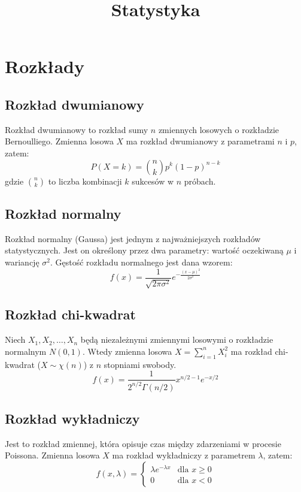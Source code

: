 \documentclass{../notatki}
\title{Statystyka}
\begin{document}
\tableofcontents

\section{Rozkłady}

\subsection{Rozkład dwumianowy}

Rozkład dwumianowy to rozkład sumy $n$ zmiennych losowych o rozkładzie
Bernoulliego. Zmienna losowa $X$ ma rozkład dwumianowy z parametrami $n$ i $p$,
zatem:
$$
P(X = k) = \binom{n}{k} p^k (1 - p)^{n-k}
$$
gdzie $\binom{n}{k}$ to liczba kombinacji $k$ sukcesów w $n$ próbach.

\subsection{Rozkład normalny}

Rozkład normalny (Gaussa) jest jednym z najważniejszych rozkładów
statystycznych. Jest on określony przez dwa parametry: wartość oczekiwaną
$\mu$ i wariancję $\sigma^2$. Gęstość rozkładu normalnego jest dana wzorem:
$$
f(x) = \frac{1}{\sqrt{2\pi\sigma^2}} e^{-\frac{(x - \mu)^2}{2\sigma^2}}
$$

\subsection{Rozkład chi-kwadrat}

Niech $X_1, X_2, \ldots, X_n$ będą niezależnymi zmiennymi losowymi o rozkładzie
normalnym $N(0, 1)$. Wtedy zmienna losowa $X = \sum_{i = 1}^{n} X_i^2$ ma
rozkład chi-kwadrat ($X \sim \chi(n)$) z $n$ stopniami swobody.
$$
f(x) =  \frac{1}{2^{n/2} \Gamma(n/2)} x^{n/2 - 1} e^{-x/2}
$$

\subsection{Rozkład wykładniczy}

Jest to rozkład zmiennej, która opisuje czas między zdarzeniami w procesie
Poissona. Zmienna losowa $X$ ma rozkład wykładniczy z parametrem $\lambda$,
zatem:
$$
f(x, \lambda) =
\begin{cases}
  \lambda e^{-\lambda x} & \text{dla } x \geq 0 \\
  0 & \text{dla } x < 0
\end{cases}
$$
\end{document}
